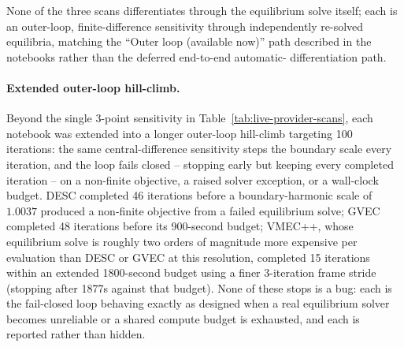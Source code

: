 \documentclass[11pt,a4paper]{article}
\begin{document}
\begin{table}[H]
\centering
{}
\caption{Live-provider boundary-harmonic scans.  ``Growth rate''/``Frequency''
span the three evaluated scale points \(1-\delta\) to \(1+\delta\); the
central-difference sensitivity is \((\text{obj.}(1+\delta)-\text{obj.}(1-\delta))/(2\delta)\)
of the scalar reduced-growth objective.  GVEC's minimizer was run at a bounded
\texttt{MaxIter=100} and did not reach its force-tolerance criterion
(\(|\text{force}|\approx2.3\times10^{-3}\) against a \(10^{-8}\) target) at any
of the three scales, so its geometry is a diagnostic near-equilibrium, not a
converged one -- consistent with each notebook's own framing of this scan as
an interface/sensitivity demonstration rather than an accepted design point.}
\label{tab:live-provider-scans}
\end{table}

None of the three scans differentiates through the equilibrium solve itself;
each is an outer-loop, finite-difference sensitivity through independently
re-solved equilibria, matching the ``Outer loop (available now)'' path
described in the notebooks rather than the deferred end-to-end automatic-
differentiation path.

\paragraph{Extended outer-loop hill-climb.}
Beyond the single 3-point sensitivity in Table~\ref{tab:live-provider-scans},
each notebook was extended into a longer outer-loop hill-climb targeting 100
iterations: the same central-difference sensitivity steps the boundary scale
every iteration, and the loop fails closed -- stopping early but keeping
every completed iteration -- on a non-finite objective, a raised solver
exception, or a wall-clock budget.  DESC completed 46 iterations before a
boundary-harmonic scale of \(1.0037\) produced a non-finite objective from a
failed equilibrium solve; GVEC completed 48 iterations before its
900-second budget; VMEC++, whose equilibrium solve is roughly two orders of
magnitude more expensive per evaluation than DESC or GVEC at this
resolution, completed 15 iterations within an extended 1800-second
budget using a finer 3-iteration frame stride (stopping after 1877s against
that budget).  None of these stops is a bug: each is the fail-closed loop
behaving exactly as designed when a real equilibrium solver becomes
unreliable or a shared compute budget is exhausted, and each is reported
rather than hidden.
\end{document}
